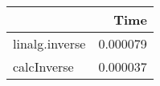 \begin{tabular}{lr}
\toprule
{} &      Time \\
\midrule
linalg.inverse &  0.000079 \\
calcInverse    &  0.000037 \\
\bottomrule
\end{tabular}
